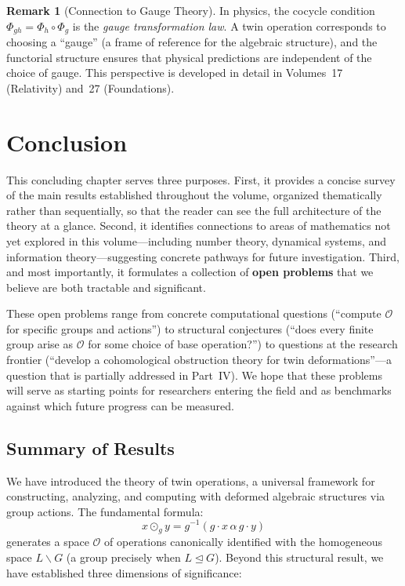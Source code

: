 \documentclass[11pt,a4paper,openany]{book}
\theoremstyle{plain}
\theoremstyle{definition}
\newtheorem{remark}[theorem]{Remark}
\newcommand{\twing}[1]{\odot_{#1}}
\newcommand{\opspace}{\mathcal{O}}
\newcommand{\lingroup}{L}
\newcommand{\groupG}{G}
\begin{document}
\begin{remark}[Connection to Gauge Theory]
In physics, the cocycle condition $\Phi_{gh} = \Phi_h \circ \Phi_g$ is the \emph{gauge transformation law}. A twin operation corresponds to choosing a ``gauge'' (a frame of reference for the algebraic structure), and the functorial structure ensures that physical predictions are independent of the choice of gauge. This perspective is developed in detail in Volumes~17 (Relativity) and~27 (Foundations).
\end{remark}


\chapter{Conclusion}
\label{ch:conclusion}

This concluding chapter serves three purposes. First, it provides a concise survey of the main results established throughout the volume, organized thematically rather than sequentially, so that the reader can see the full architecture of the theory at a glance. Second, it identifies connections to areas of mathematics not yet explored in this volume---including number theory, dynamical systems, and information theory---suggesting concrete pathways for future investigation. Third, and most importantly, it formulates a collection of \textbf{open problems} that we believe are both tractable and significant.

These open problems range from concrete computational questions (``compute $\opspace$ for specific groups and actions'') to structural conjectures (``does every finite group arise as $\opspace$ for some choice of base operation?'') to questions at the research frontier (``develop a cohomological obstruction theory for twin deformations''---a question that is partially addressed in Part~IV). We hope that these problems will serve as starting points for researchers entering the field and as benchmarks against which future progress can be measured.

\section{Summary of Results}

We have introduced the theory of twin operations, a universal framework for constructing, analyzing, and computing with deformed algebraic structures via group actions. The fundamental formula:
\[
x \twing{g} y = g^{-1}(g \cdot x \,\alpha\, g \cdot y)
\]
generates a space $\opspace$ of operations canonically identified with the homogeneous space $\lingroup\backslash\groupG$ (a group precisely when $\lingroup\trianglelefteq\groupG$). Beyond this structural result, we have established three dimensions of significance:
\end{document}

